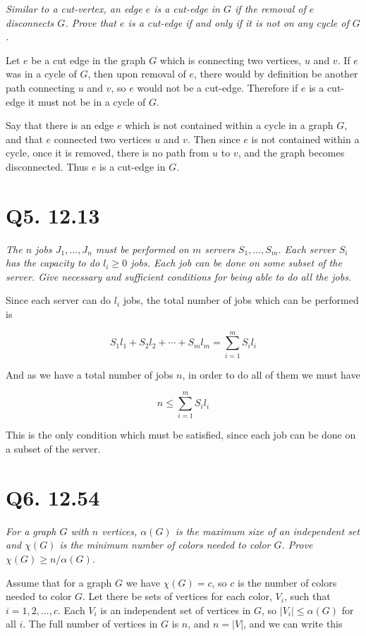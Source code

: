 \documentclass{article}
\begin{document}
\textit{Similar to a cut-vertex, an edge $e$ is a cut-edge in $G$ if the removal of $e$ disconnects $G$. Prove that $e$ is a cut-edge if and only if it is not on any cycle of $G$.}

Let $e$ be a cut edge in the graph $G$ which is connecting two vertices, $u$ and $v$. If $e$ was in a cycle of $G$, then upon removal of $e$, there would by definition be another path connecting $u$ and $v$, so $e$ would not be a cut-edge. Therefore if $e$ is a cut-edge it must not be in a cycle of $G$.

Say that there is an edge $e$ which is not contained within a cycle in a graph $G$, and that $e$ connected two vertices $u$ and $v$. Then since $e$ is not contained within a cycle, once it is removed, there is no path from $u$ to $v$, and the graph becomes disconnected. Thus $e$ is a cut-edge in $G$.



\section*{Q5. 12.13}

\textit{The $n$ jobs $J_1, \dots, J_n$ must be performed on $m$ servers $S_1, \dots, S_m$. Each server $S_i$ has the capacity to do $l_i \geq 0$ jobs. Each job can be done on some subset of the server. Give necessary and sufficient conditions for being able to do all the jobs.}

Since each server can do $l_i$ jobs, the total number of jobs which can be performed is

$$S_1l_1 + S_2l_2 + \cdots + S_ml_m = \sum_{i=1}^{m} S_il_i$$

And as we have a total number of jobs $n$, in order to do all of them we must have

$$n \leq \sum_{i=1}^{m} S_il_i$$

This is the only condition which must be satisfied, since each job can be done on a subset of the server.



\section*{Q6. 12.54}

\textit{For a graph $G$ with $n$ vertices, $\alpha(G)$ is the maximum size of an independent set and $\chi(G)$ is the minimum number of colors needed to color $G$. Prove $\chi(G) \geq n/\alpha(G)$.}

Assume that for a graph $G$ we have $\chi(G) = c$, so $c$ is the number of colors needed to color $G$. Let there be sets of vertices for each color, $V_i$, such that $i = 1,2,\dots, c$. Each $V_i$ is an independent set of vertices in $G$, so $|V_i| \leq \alpha(G)$ for all $i$. The full number of vertices in $G$ is $n$, and $n = |V|$, and we can write this
\end{document}
